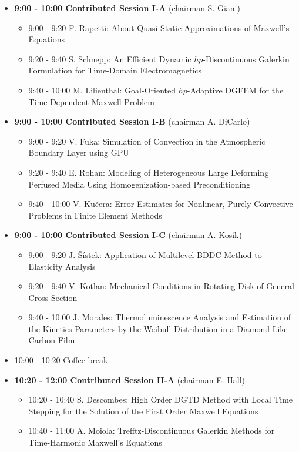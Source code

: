 \documentclass[10pt, A4]{article}%
\begin{document}
\begin{itemize}    
  \item {\bf 9:00 - 10:00 Contributed Session I-A} (chairman S. Giani) 
  \begin{itemize}
    \item 9:00 - 9:20 F. Rapetti: About Quasi-Static Approximations of Maxwell's Equations
    \item 9:20 - 9:40 S. Schnepp: An Efficient Dynamic $hp$-Discontinuous Galerkin Formulation for Time-Domain Electromagnetics
    \item 9:40 - 10:00 M. Lilienthal: Goal-Oriented $hp$-Adaptive DGFEM for the Time-Dependent Maxwell Problem
  \end{itemize}
  \item {\bf 9:00 - 10:00 Contributed Session I-B} (chairman A. DiCarlo) 
  \begin{itemize}
    \item 9:00 - 9:20 V. Fuka: Simulation of Convection in the Atmospheric Boundary Layer using GPU
    \item 9:20 - 9:40 E. Rohan: Modeling of Heterogeneous Large Deforming Perfused Media Using Homogenization-based Preconditioning
    \item 9:40 - 10:00 V. Ku\v{c}era: Error Estimates for Nonlinear, Purely Convective Problems in Finite Element Methods
  \end{itemize}
    \item {\bf 9:00 - 10:00 Contributed Session I-C} (chairman A. Kos\'{i}k) 
  \begin{itemize}
    \item 9:00 - 9:20 J. \v{S}\'{i}stek: Application of Multilevel BDDC Method to Elasticity Analysis  
    \item 9:20 - 9:40 V. Kotlan: Mechanical Conditions in Rotating Disk of General Cross-Section
    \item 9:40 - 10:00 J. Morales: Thermoluminescence Analysis and Estimation of the Kinetics Parameters by the Weibull Distribution in a Diamond-Like Carbon Film
  \end{itemize}
  \item 10:00 - 10:20 Coffee break
  \item {\bf 10:20 - 12:00 Contributed Session II-A} (chairman E. Hall) 
  \begin{itemize}
    \item 10:20 - 10:40 S. Descombes: High Order DGTD Method with Local Time Stepping for the Solution of the First Order Maxwell Equations
    \item 10:40 - 11:00 A. Moiola: Trefftz-Discontinuous Galerkin Methods for Time-Harmonic Maxwell’s Equations

\end{itemize}
\end{itemize}
\end{document}
